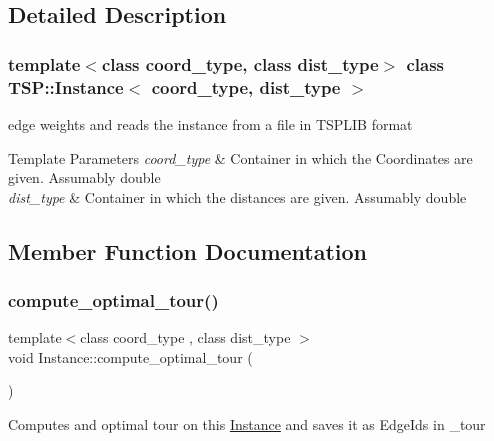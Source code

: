 \subsection{Detailed Description}
\subsubsection*{template$<$class coord\+\_\+type, class dist\+\_\+type$>$\newline
class T\+S\+P\+::\+Instance$<$ coord\+\_\+type, dist\+\_\+type $>$}

edge weights and reads the instance from a file in T\+S\+P\+L\+IB format 
\begin{DoxyTemplParams}{Template Parameters}
{\em coord\+\_\+type} & Container in which the Coordinates are given. Assumably double \\
\hline
{\em dist\+\_\+type} & Container in which the distances are given. Assumably double \\
\hline
\end{DoxyTemplParams}


\subsection{Member Function Documentation}
\mbox{\label{classTSP_1_1Instance_a306e8ef90273445f42555d338887a9ed}} 
\subsubsection{\texorpdfstring{compute\+\_\+optimal\+\_\+tour()}{compute\_optimal\_tour()}}
{\footnotesize\ttfamily template$<$class coord\+\_\+type , class dist\+\_\+type $>$ \\
void Instance\+::compute\+\_\+optimal\+\_\+tour (\begin{DoxyParamCaption}{ }\end{DoxyParamCaption})}

Computes and optimal tour on this \hyperlink{classTSP_1_1Instance}{Instance} and saves it as Edge\+Ids in \+\_\+tour \mbox{\label{classTSP_1_1Instance_a8d0deb55c708cc6e926b32fc298d60d1}} 
